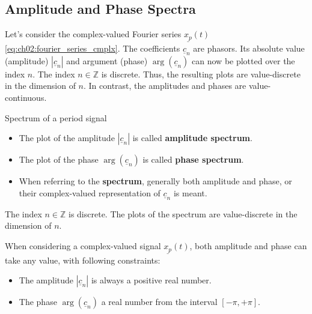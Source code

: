 \begin{refsection}
\subsection{Amplitude and Phase Spectra}

Let's consider the complex-valued Fourier series $\underline{x_p}(t)$ \eqref{eq:ch02:fourier_series_cmplx}. The coefficients $\underline{c}_n$ are phasors. Its absolute value (amplitude) $|\underline{c}_n|$ and argument (phase) $\arg\left(\underline{c}_n\right)$ can now be plotted over the index $n$. The index $n \in \mathbb{Z}$ is discrete. Thus, the resulting plots are value-discrete in the dimension of $n$. In contrast, the amplitudes and phases are value-continuous.

\begin{definition}{Spectrum of a period signal}
	\begin{itemize}
		\item The plot of the amplitude $|\underline{c}_n|$ is called  \textbf{amplitude spectrum}.
		\item The plot of the phase $\arg\left(\underline{c}_n\right)$ is called  \textbf{phase spectrum}.
		\item When referring to the  \textbf{spectrum}, generally both amplitude and phase, or their complex-valued representation of $\underline{c}_n$ is meant.
	\end{itemize}
\end{definition}

\begin{fact}
	The index $n \in \mathbb{Z}$ is discrete. The plots of the spectrum are value-discrete in the dimension of $n$.
\end{fact}

When considering a complex-valued signal $\underline{x_p}(t)$, both amplitude and phase can take any value, with following constraints:
\begin{itemize}
	\item The amplitude $|\underline{c}_n|$ is always a positive real number.
	\item The phase $\arg\left(\underline{c}_n\right)$ a real number from the interval $[-\pi, +\pi]$.
\end{itemize}


\end{refsection}
